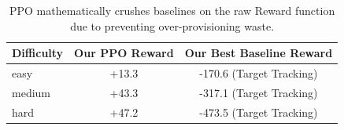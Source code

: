 \documentclass[11pt,a4paper]{article}
\begin{document}
\begin{table}[h!]
\centering
\begin{tabular}{lSc}
\toprule
Difficulty & {Our PPO Reward} & {Our Best Baseline Reward} \\
\midrule
easy   & +13.3 & -170.6 (Target Tracking) \\
medium & +43.3 & -317.1 (Target Tracking) \\
hard   & +47.2 & -473.5 (Target Tracking) \\
\bottomrule
\end{tabular}
\caption{PPO mathematically crushes baselines on the raw Reward function due to preventing over-provisioning waste.}
\end{table}
\end{document}
